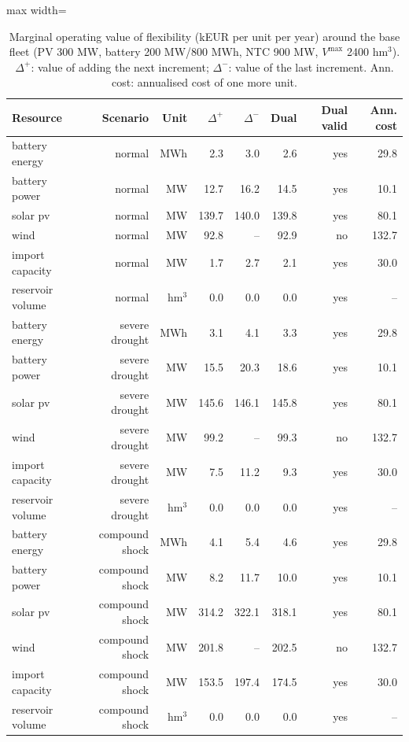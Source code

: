 \begin{table}[htbp]
\centering
\footnotesize
\caption{Marginal operating value of flexibility (kEUR per unit per year) around the base fleet (PV 300 MW, battery 200 MW/800 MWh, NTC 900 MW, $V^{\max}$ 2400 hm$^3$). $\Delta^+$: value of adding the next increment; $\Delta^-$: value of the last increment. Ann. cost: annualised cost of one more unit.}
\label{tab:marginal}
\begin{adjustbox}{max width=\linewidth}
\begin{tabular}{lrrrrrrr}
\toprule
Resource & Scenario & Unit & $\Delta^+$ & $\Delta^-$ & Dual & Dual valid & Ann. cost \\
\midrule
battery energy & normal & MWh & 2.3 & 3.0 & 2.6 & yes & 29.8 \\
battery power & normal & MW & 12.7 & 16.2 & 14.5 & yes & 10.1 \\
solar pv & normal & MW & 139.7 & 140.0 & 139.8 & yes & 80.1 \\
wind & normal & MW & 92.8 & -- & 92.9 & no & 132.7 \\
import capacity & normal & MW & 1.7 & 2.7 & 2.1 & yes & 30.0 \\
reservoir volume & normal & hm$^3$ & 0.0 & 0.0 & 0.0 & yes & -- \\
battery energy & severe drought & MWh & 3.1 & 4.1 & 3.3 & yes & 29.8 \\
battery power & severe drought & MW & 15.5 & 20.3 & 18.6 & yes & 10.1 \\
solar pv & severe drought & MW & 145.6 & 146.1 & 145.8 & yes & 80.1 \\
wind & severe drought & MW & 99.2 & -- & 99.3 & no & 132.7 \\
import capacity & severe drought & MW & 7.5 & 11.2 & 9.3 & yes & 30.0 \\
reservoir volume & severe drought & hm$^3$ & 0.0 & 0.0 & 0.0 & yes & -- \\
battery energy & compound shock & MWh & 4.1 & 5.4 & 4.6 & yes & 29.8 \\
battery power & compound shock & MW & 8.2 & 11.7 & 10.0 & yes & 10.1 \\
solar pv & compound shock & MW & 314.2 & 322.1 & 318.1 & yes & 80.1 \\
wind & compound shock & MW & 201.8 & -- & 202.5 & no & 132.7 \\
import capacity & compound shock & MW & 153.5 & 197.4 & 174.5 & yes & 30.0 \\
reservoir volume & compound shock & hm$^3$ & 0.0 & 0.0 & 0.0 & yes & -- \\
\bottomrule
\end{tabular}
\end{adjustbox}
\end{table}
